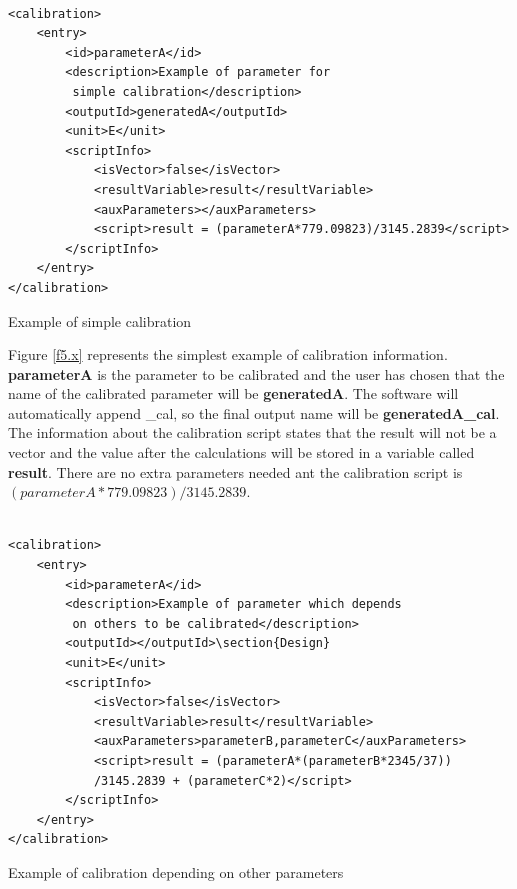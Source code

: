 \begin{table}[H]
\lstset{language=XML}
\begin{lstlisting}

<calibration>
	<entry>
		<id>parameterA</id>
		<description>Example of parameter for
		 simple calibration</description>
		<outputId>generatedA</outputId> 
		<unit>E</unit>
		<scriptInfo>
			<isVector>false</isVector>
			<resultVariable>result</resultVariable>
			<auxParameters></auxParameters>
			<script>result = (parameterA*779.09823)/3145.2839</script>
		</scriptInfo>
	</entry>
</calibration>
\end{lstlisting}
\caption{Example of simple calibration}
\label{Table5.x}
\end{table}

Figure \ref{f5.x} represents the simplest example of calibration information. \textbf{parameterA} is the parameter to be calibrated and the user has chosen that the name of the calibrated parameter will be \textbf{generatedA}. The software will automatically append  \_cal, so the final output name will be \textbf{generatedA\_cal}. The information about the calibration script states that the result will not be a vector and the value after the calculations will be stored in a variable called \textbf{result}. There are no extra parameters needed ant the calibration script is $(parameterA*779.09823)/3145.2839$.

\begin{table}[H]
\lstset{language=XML}
\begin{lstlisting}

<calibration>
	<entry>
		<id>parameterA</id>
		<description>Example of parameter which depends
		 on others to be calibrated</description>
		<outputId></outputId>\section{Design}
		<unit>E</unit>
		<scriptInfo>
			<isVector>false</isVector>
			<resultVariable>result</resultVariable>
			<auxParameters>parameterB,parameterC</auxParameters>
			<script>result = (parameterA*(parameterB*2345/37))
			/3145.2839 + (parameterC*2)</script>
		</scriptInfo>
	</entry>
</calibration>
\end{lstlisting}
\caption{Example of calibration depending on other parameters}
\label{Table5.x}
\end{table}

